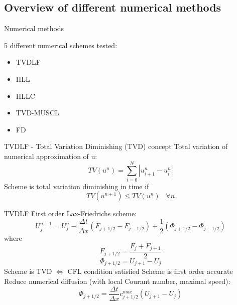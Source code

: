 \subsection{Overview of different numerical methods}
\begin{frame}{Numerical methods}

5 different numerical schemes tested:
\begin{itemize}
  	\item TVDLF
  	\item  HLL
  	\item HLLC
  	\item TVD-MUSCL 
  	\item FD
\end{itemize}

\end{frame}



\begin{frame}{TVDLF - Total Variation Diminishing (TVD) concept}
	Total variation of numerical approximation of u:
	\begin{equation*}
		TV(u^n) = \sum_{i=0}^{N} |u_{i+1}^n-u_i^n|
	\end{equation*}
	Scheme is total variation diminishing in time if
	\begin{equation*}
		TV(u^{n+1}) \leq TV(u^{n}) \; \; \; \forall n
	\end{equation*}
\end{frame}


\begin{frame}{TVDLF}
	First order Lax-Friedrichs scheme:
	\begin{equation*}
		U_j^{n+1} = U_j^n - \frac{\Delta t}{\Delta x} \left( F_{j+1/2} - F_{j-1/2} \right) + \frac{1}{2} \left( \Phi_{j+1/2} - \Phi_{j-1/2} \right)
	\end{equation*}
	where
	\begin{equation*}
		F_{j+1/2} = \frac{F_j + F_{j+1}}{2}
	\end{equation*}
	\begin{equation*}
		\Phi_{j+1/2} = U_{j+1}-U_j
	\end{equation*}
	Scheme is TVD $\Leftrightarrow$ CFL condition satisfied \newline
	Scheme is first order accurate \newline
	Reduce numerical diffusion (with local Courant number, maximal speed):
	\begin{equation*}
		\Phi_{j+1/2} = \frac{\Delta t}{\Delta x} c_{j+1/2}^{max} \left( U_{j+1}-U_j \right)
	\end{equation*}
\end{frame}
	
